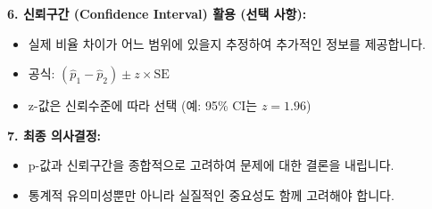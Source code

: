 \documentclass[11pt,a4paper]{article}
\begin{document}
\begin{tcolorbox}[colback=myblue!5!white, colframe=myblue!75!black, title=\textbf{두 표본 비율 검정 핵심 요약}]
\textbf{6. 신뢰구간 (Confidence Interval) 활용 (선택 사항):}
\begin{itemize}
    \item 실제 비율 차이가 어느 범위에 있을지 추정하여 추가적인 정보를 제공합니다.
    \item 공식: $(\hat{p}_1 - \hat{p}_2) \pm z \times \text{SE}$
    \item z-값은 신뢰수준에 따라 선택 (예: 95\% CI는 $z=1.96$)
\end{itemize}

\textbf{7. 최종 의사결정:}
\begin{itemize}
    \item p-값과 신뢰구간을 종합적으로 고려하여 문제에 대한 결론을 내립니다.
    \item 통계적 유의미성뿐만 아니라 실질적인 중요성도 함께 고려해야 합니다.
\end{itemize}
\end{tcolorbox}
\end{document}

